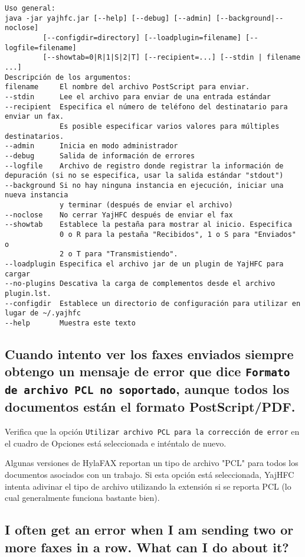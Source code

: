 \documentclass[a4paper,10pt]{scrartcl}
\begin{document}
\begin{verbatim}
Uso general:
java -jar yajhfc.jar [--help] [--debug] [--admin] [--background|--noclose]
         [--configdir=directory] [--loadplugin=filename] [--logfile=filename]
         [--showtab=0|R|1|S|2|T] [--recipient=...] [--stdin | filename ...]
Descripción de los argumentos:
filename     El nombre del archivo PostScript para enviar.
--stdin      Lee el archivo para enviar de una entrada estándar
--recipient  Especifica el número de teléfono del destinatario para enviar un fax.
             Es posible especificar varios valores para múltiples destinatarios.
--admin      Inicia en modo administrador
--debug      Salida de información de errores
--logfile    Archivo de registro donde registrar la información de depuración (si no se especifica, usar la salida estándar "stdout")
--background Si no hay ninguna instancia en ejecución, iniciar una nueva instancia
             y terminar (después de enviar el archivo)
--noclose    No cerrar YajHFC después de enviar el fax
--showtab    Establece la pestaña para mostrar al inicio. Especifica 
             0 o R para la pestaña "Recibidos", 1 o S para "Enviados" o
             2 o T para "Transmistiendo".
--loadplugin Especifica el archivo jar de un plugin de YajHFC para cargar
--no-plugins Descativa la carga de complementos desde el archivo plugin.lst.
--configdir  Establece un directorio de configuración para utilizar en lugar de ~/.yajhfc
--help       Muestra este texto
\end{verbatim}


\subsection{Cuando intento ver los faxes enviados siempre obtengo un mensaje de error 
   que dice \texttt{Formato de archivo PCL no soportado}, aunque todos los documentos 
   están el formato PostScript/PDF.}

Verifica que la opción \texttt{Utilizar archivo PCL para la corrección de error} en el 
cuadro de Opciones está seleccionada e inténtalo de nuevo.
 
Algunas versiones de HylaFAX reportan 
un tipo de archivo "PCL" para todos los documentos asociados con un trabajo. 
Si esta opción está seleccionada, YajHFC intenta adivinar el tipo de archivo 
utilizando la extensión si se reporta PCL (lo cual generalmente funciona bastante bien).

\subsection{I often get an error when I am sending two or more faxes in a row. What can I do about it?}
\end{document}
